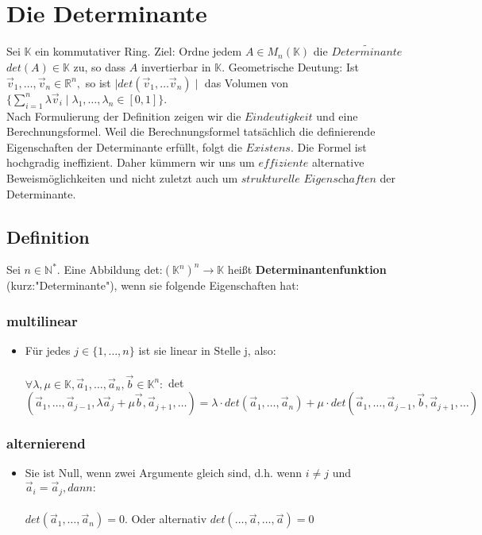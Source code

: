 \documentclass[titlepage]{article}
\newcommand{\K}{\mathbb{K}}
\newcommand{\N}{\mathbb{N}}
\newcommand{\R}{\mathbb{R}}
\newcommand{\1}{\mathbb{1}}
\newcommand{\0}{\mathbb{0}}
\begin{document}
		\section{Die Determinante}
			Sei $\K$ ein kommutativer Ring. Ziel: Ordne jedem $A\in M_n(\K)$ die $\tilde{Determinante}$ $det(A)\in\K$ zu, so dass $A$ invertierbar in $\K$. Geometrische Deutung: Ist $\vec{v}_1,\dots,\vec{v}_n\in\R^n,$ so ist $\mid det(\vec{v}_1,\dots\vec{v}_n)\mid$ das Volumen von $\{\sum_{i=1}^n\lambda\vec{v}_i\mid\lambda_1,\dots,\lambda_n\in[0,1]\}.$\\
			\indent Nach Formulierung der Definition zeigen wir die $\textit{Eindeutigkeit}$ und eine Berechnungsformel. Weil die Berechnungsformel tatsächlich die definierende Eigenschaften der Determinante erfüllt, folgt die $\textit{Existens}.$ Die Formel ist hochgradig ineffizient. Daher kümmern wir uns um $\textit{effiziente}$ alternative Beweismöglichkeiten und nicht zuletzt auch um $\textit{strukturelle Eigenschaften}$ der Determinante.
			\subsection{Definition}
				Sei $n\in\N^*.$ Eine Abbildung det:$(\K^n)^n\rightarrow\K$ heißt \textbf{Determinantenfunktion} (kurz:"Determinante"), wenn sie folgende Eigenschaften hat:
				\subsubsection{multilinear}
					\begin{itemize}
						\item Für jedes $j\in\{1,\dots,n\}$ ist sie linear in Stelle j, also:\\\\ $\forall\lambda,\mu\in\K,\vec{a}_1,\dots,\vec{a}_n,\vec{b}\in\K^n:$ det$(\vec{a}_1,\dots,\vec{a}_{j-1},\lambda\vec{a}_j+\mu\vec{b},\vec{a}_{j+1},\dots)=\lambda\cdot det(\vec{a}_1,\dots,\vec{a}_n)+\mu\cdot det(\vec{a}_1,\dots,\vec{a}_{j-1},\vec{b},\vec{a}_{j+1},\dots)$
					\end{itemize}
				\subsubsection{alternierend}
					\begin{itemize}
						\item Sie ist Null, wenn zwei Argumente gleich sind, d.h. wenn $i\neq j$ und $\vec{a}_i=\vec{a}_j, dann:$\\\\ $det(\vec{a}_1,\dots,\vec{a}_n)=0.$ Oder alternativ $det(\dots,\vec{a},\dots,\vec{a})=0$
					\end{itemize}
\end{document}
